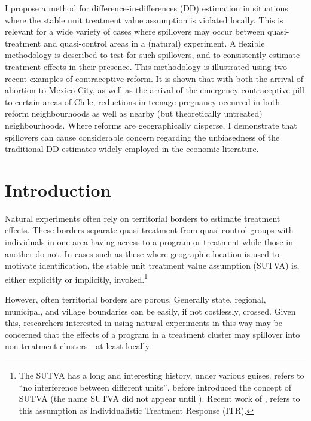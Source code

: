 \begin{chapabstract}
I propose a method for difference-in-differences (DD) estimation in situations 
where the stable unit treatment value assumption is violated locally. This is
relevant for a wide variety of cases where spillovers may occur between quasi-%
treatment and quasi-control areas in a (natural) experiment. A flexible 
methodology is described to test for such spillovers, and to consistently 
estimate treatment effects in their presence. This methodology is illustrated
using two recent examples of contraceptive reform.  It is shown that with both
the arrival of abortion to Mexico City, as well as the arrival of the emergency 
contraceptive pill to certain areas of Chile, reductions in teenage pregnancy 
occurred in both reform neighbourhoods as well as nearby (but theoretically 
untreated) neighbourhoods.  Where reforms are geographically disperse, I 
demonstrate that spillovers can cause considerable concern regarding the 
unbiasedness of the traditional DD estimates widely employed in the economic 
literature. \moreabst
\end{chapabstract}
\JELs
\newpage
\section{Introduction}
Natural experiments often rely on territorial borders to estimate treatment 
effects.  These borders separate quasi-treatment from quasi-control groups with
individuals in one area having access to a program or treatment while those in 
another do not.  In cases such as these where geographic location is used to 
motivate identification, the stable unit treatment value assumption (SUTVA) is, 
either explicitly or implicitly, invoked.\footnote{The SUTVA has a long and 
interesting history, under various guises. \citet{Cox1958} refers to ``no 
interference between different units'', before \citet{Rubin1978} introduced the 
concept of SUTVA (the name SUTVA did not appear until \citet{Rubin1980}).  
Recent work of \citet{Manski2013}, refers to this assumption as Individualistic 
Treatment Response (ITR).}

However, often territorial borders are porous.  Generally state, regional,
municipal, and village boundaries can be easily, if not costlessly, crossed.
Given this, researchers interested in using natural experiments in this way may
be concerned that the effects of a program in a treatment cluster may spillover 
into non-treatment clusters---at least locally.

